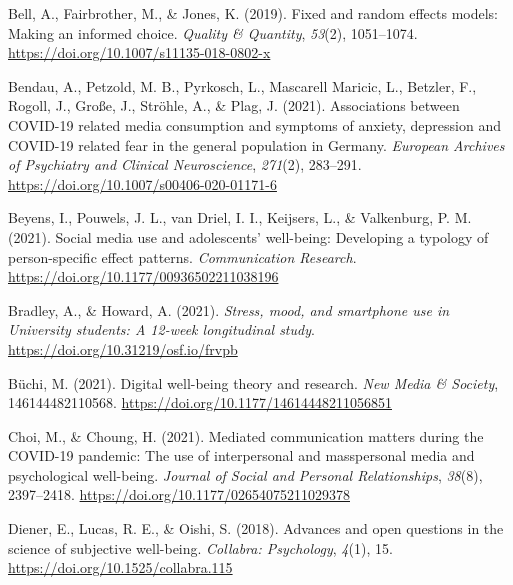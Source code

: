 \documentclass[
  man,floatsintext]{apa7}
\newlength{\cslhangindent}
\newlength{\cslentryspacingunit} %
\newenvironment{CSLReferences}[2] %
 {%
  \setlength{\parindent}{0pt}
  \ifodd #1
  \let\oldpar\par
  \def\par{\hangindent=\cslhangindent\oldpar}
  \fi
  \setlength{\parskip}{#2\cslentryspacingunit}
 }%
 {}
\begin{document}
\hypertarget{refs}{}
\begin{CSLReferences}{1}{0}
\leavevmode{}%
Bell, A., Fairbrother, M., \& Jones, K. (2019). Fixed and random effects models: Making an informed choice. \emph{Quality \& Quantity}, \emph{53}(2), 1051--1074. \url{https://doi.org/10.1007/s11135-018-0802-x}

\leavevmode{}%
Bendau, A., Petzold, M. B., Pyrkosch, L., Mascarell Maricic, L., Betzler, F., Rogoll, J., Große, J., Ströhle, A., \& Plag, J. (2021). Associations between {COVID-19} related media consumption and symptoms of anxiety, depression and {COVID-19} related fear in the general population in {Germany}. \emph{European Archives of Psychiatry and Clinical Neuroscience}, \emph{271}(2), 283--291. \url{https://doi.org/10.1007/s00406-020-01171-6}

\leavevmode{}%
Beyens, I., Pouwels, J. L., van Driel, I. I., Keijsers, L., \& Valkenburg, P. M. (2021). Social media use and adolescents' well-being: {Developing} a typology of person-specific effect patterns. \emph{Communication Research}. \url{https://doi.org/10.1177/00936502211038196}

\leavevmode{}%
Bradley, A., \& Howard, A. (2021). \emph{Stress, mood, and smartphone use in {University} students: {A} 12-week longitudinal study}. \url{https://doi.org/10.31219/osf.io/frvpb}

\leavevmode{}%
Büchi, M. (2021). Digital well-being theory and research. \emph{New Media \& Society}, 146144482110568. \url{https://doi.org/10.1177/14614448211056851}

\leavevmode{}%
Choi, M., \& Choung, H. (2021). Mediated communication matters during the {COVID-19} pandemic: {The} use of interpersonal and masspersonal media and psychological well-being. \emph{Journal of Social and Personal Relationships}, \emph{38}(8), 2397--2418. \url{https://doi.org/10.1177/02654075211029378}

\leavevmode{}%
Diener, E., Lucas, R. E., \& Oishi, S. (2018). Advances and open questions in the science of subjective well-being. \emph{Collabra: Psychology}, \emph{4}(1), 15. \url{https://doi.org/10.1525/collabra.115}


\end{CSLReferences}
\end{document}
